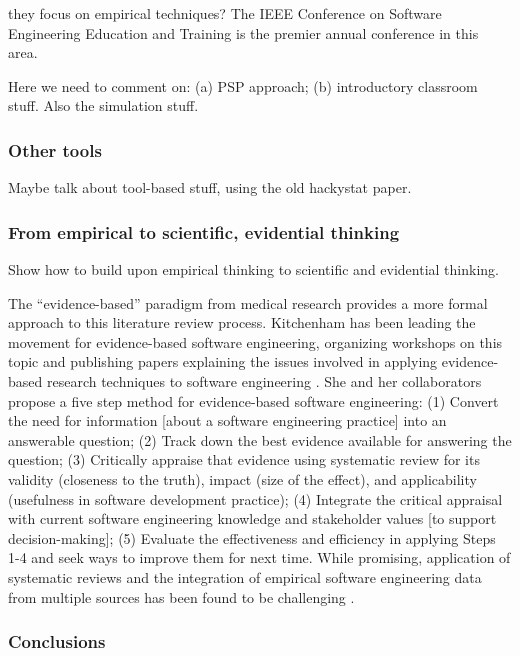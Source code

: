 they focus on empirical techniques?  The IEEE Conference on Software
Engineering Education and Training is the premier annual conference in this
area.

Here we need to comment on: (a) PSP approach; (b) introductory classroom stuff.  Also the simulation stuff.  

\subsubsection{Other tools}

Maybe talk about tool-based stuff, using the old hackystat paper. 

\subsubsection{From empirical to scientific, evidential thinking}

Show how to build upon empirical thinking to scientific and evidential thinking. 

The ``evidence-based'' paradigm from medical research provides a more
formal approach to this literature review process.  Kitchenham has been
leading the movement for evidence-based software engineering, organizing
workshops on this topic and publishing papers explaining the issues
involved in applying evidence-based research techniques to software
engineering \cite{Kitchenham04,Kitchenham04a}.  She and her collaborators
propose a five step method for evidence-based software engineering: (1)
Convert the need for information [about a software engineering practice]
into an answerable question; (2) Track down the best evidence available for
answering the question; (3) Critically appraise that evidence using
systematic review for its validity (closeness to the truth), impact (size
of the effect), and applicability (usefulness in software development
practice); (4) Integrate the critical appraisal with current software
engineering knowledge and stakeholder values [to support decision-making];
(5) Evaluate the effectiveness and efficiency in applying Steps 1-4 and
seek ways to improve them for next time.  While promising, application of
systematic reviews and the integration of empirical software engineering
data from multiple sources has been found to be challenging
\cite{Jedlitschka04}.


\subsubsection{Conclusions}

